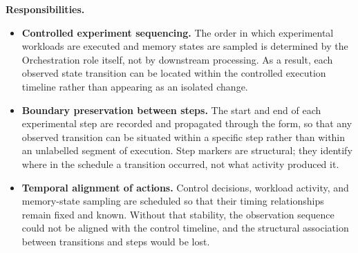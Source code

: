   \textbf{Responsibilities.}
  \begin{itemize}
    \item \textbf{Controlled experiment sequencing.} The order in which experimental workloads are executed and memory states are sampled is determined by the Orchestration role itself, not by downstream processing. As a result, each observed state transition can be located within the controlled execution timeline rather than appearing as an isolated change.
    \item \textbf{Boundary preservation between steps.} The start and end of each experimental step are recorded and propagated through the form, so that any observed transition can be situated within a specific step rather than within an unlabelled segment of execution. Step markers are structural; they identify where in the schedule a transition occurred, not what activity produced it.
    \item \textbf{Temporal alignment of actions.} Control decisions, workload activity, and memory-state sampling are scheduled so that their timing relationships remain fixed and known. Without that stability, the observation sequence could not be aligned with the control timeline, and the structural association between transitions and steps would be lost.
  \end{itemize}


